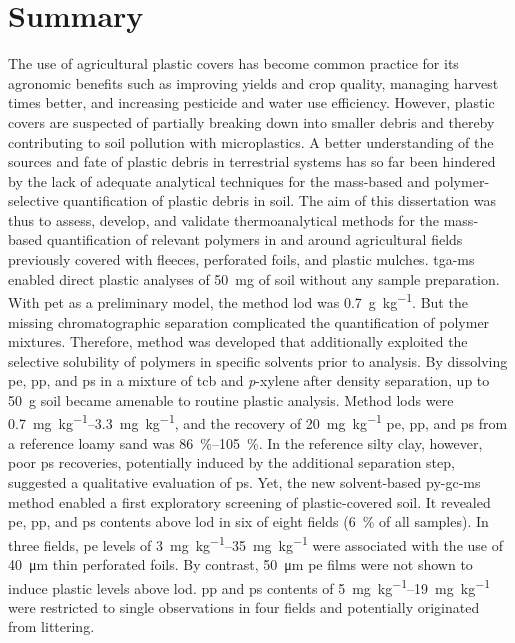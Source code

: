 
\chapter{Summary}

The use of agricultural plastic covers has become common practice for its agronomic benefits such as improving yields and crop quality, managing harvest times better, and increasing pesticide and water use efficiency. However, plastic covers are suspected of partially breaking down into smaller debris and thereby contributing to soil pollution with microplastics.
A better understanding of the sources and fate of plastic debris in terrestrial systems has so far been hindered by the lack of adequate analytical techniques for the mass-based and polymer-selective quantification of plastic debris in soil. The aim of this dissertation was thus to assess, develop, and validate thermoanalytical methods for the mass-based quantification of relevant polymers in and around agricultural fields previously covered with fleeces, perforated foils, and plastic mulches.
\Ac{tga-ms} enabled direct plastic analyses of \SI{50}{\milli\gram} of soil without any sample preparation. With \ac{pet} as a preliminary model, the method \ac{lod} was \SI{0.7}{\gram\per\kilo\gram}. But the missing chromatographic separation complicated the quantification of polymer mixtures. Therefore,  method was developed that additionally exploited the selective solubility of polymers in specific solvents prior to analysis. By dissolving \ac{pe}, \ac{pp}, and \ac{ps} in a mixture of \acl{tcb} and \textit{p}-xylene after density separation, up to \SI{50}{\gram} soil became amenable to routine plastic analysis. Method \acp{lod} were \SIrange{0.7}{3.3}{\milli\gram\per\kilo\gram}, and the recovery of \SI{20}{\milli\gram\per\kilo\gram} \ac{pe}, \ac{pp}, and \ac{ps} from a reference loamy sand was \SIrange{86}{105}{\percent}. In the reference silty clay, however, poor \ac{ps} recoveries, potentially induced by the additional separation step, suggested a qualitative evaluation of \ac{ps}.
Yet, the new solvent-based \ac{py-gc-ms} method enabled a first exploratory screening of plastic-covered soil. It revealed \ac{pe}, \ac{pp}, and \ac{ps} contents above \ac{lod} in six of eight fields (\SI{6}{\percent} of all samples). In three fields, \ac{pe} levels of \SIrange{3}{35}{\milli\gram\per\kilo\gram} were associated with the use of \SI{40}{\micro\meter} thin perforated foils. By contrast, \SI{50}{\micro\meter} \ac{pe} films were not shown to induce plastic levels above \ac{lod}. \Ac{pp} and \ac{ps} contents of \SIrange{5}{19}{\milli\gram\per\kilo\gram} were restricted to single observations in four fields and potentially originated from littering.
